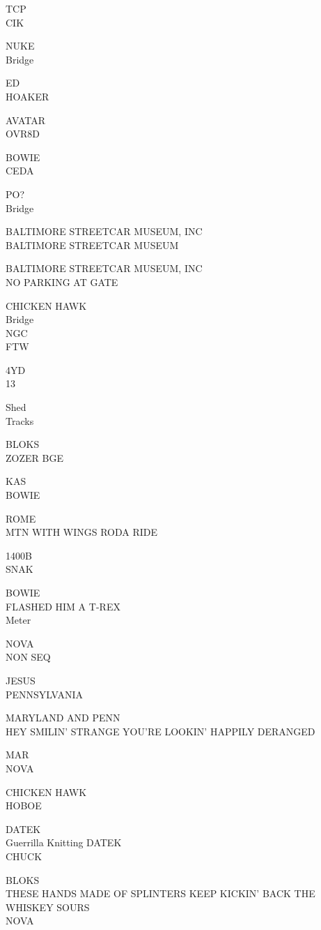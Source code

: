 \documentclass[10pt,letterpaper]{article}
\begin{document}
TCP\\
CIK

NUKE\\
Bridge

ED\\
HOAKER

AVATAR\\
OVR8D

BOWIE\\
CEDA

PO?\\
Bridge

BALTIMORE STREETCAR MUSEUM, INC\\
BALTIMORE STREETCAR MUSEUM

BALTIMORE STREETCAR MUSEUM, INC\\
NO PARKING AT GATE

CHICKEN HAWK\\
Bridge\\
NGC\\
FTW

4YD\\
13

Shed\\
Tracks

BLOKS\\
ZOZER BGE

KAS\\
BOWIE

ROME\\
MTN WITH WINGS RODA RIDE

1400B\\
SNAK

BOWIE\\
FLASHED HIM A T{-}REX\\
Meter

NOVA\\
NON SEQ

JESUS\\
PENNSYLVANIA

MARYLAND AND PENN\\
HEY SMILIN' STRANGE YOU'RE LOOKIN' HAPPILY DERANGED

MAR\\
NOVA

CHICKEN HAWK\\
HOBOE

DATEK\\
Guerrilla Knitting DATEK\\
CHUCK

BLOKS\\
THESE HANDS MADE OF SPLINTERS KEEP KICKIN' BACK THE WHISKEY SOURS\\
NOVA
\end{document}
